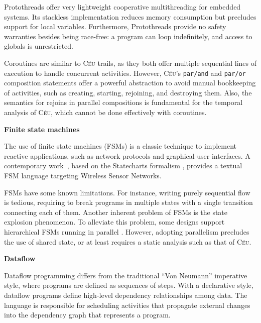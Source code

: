 \documentclass[11pt,a4paper]{article}
\newcommand{\2}{\;\;}
\newcommand{\5}{\;\;\;\;\;}
\newcommand{\CEU}{\textsc{C\'{e}u}}
\newcommand{\code}[1] {{\small{\texttt{#1}}}}
\begin{document}
Protothreads \cite{wsn.protothreads} offer very lightweight cooperative 
multithreading for embedded systems.
Its stackless implementation reduces memory consumption but precludes support 
for local variables.
Furthermore, Protothreads provide no safety warranties besides being race-free: 
a program can loop indefinitely, and access to globals is unrestricted.

Coroutines are similar to \CEU{} trails, as they both offer multiple sequential 
lines of execution to handle concurrent activities.
However, \CEU{}'s \code{par/and} and \code{par/or} composition statements offer 
a powerful abstraction to avoid manual bookkeeping of activities, such as 
creating, starting, rejoining, and destroying them.
Also, the semantics for rejoins in parallel compositions is fundamental for the 
temporal analysis of \CEU{}, which cannot be done effectively with coroutines.

\textbf{Finite state machines}

The use of finite state machines (FSMs) is a classic technique to implement
reactive applications, such as network protocols and graphical user interfaces.
A contemporary work~\cite{wsn.osm}, based on the Statecharts formalism 
\cite{statecharts.visual}, provides a textual FSM language targeting Wireless 
Sensor Networks.

FSMs have some known limitations.
For instance, writing purely sequential flow is tedious, requiring to break 
programs in multiple states with a single transition connecting each of them.  
Another inherent problem of FSMs is the state explosion phenomenon.
To alleviate this problem, some designs support hierarchical FSMs running in 
parallel \cite{wsn.osm}.
However, adopting parallelism precludes the use of shared state, or at least 
requires a static analysis such as that of \CEU{}.



\textbf{Dataflow}

Dataflow programming \cite{lustre.ieee91,lucid} differs from the traditional 
``Von Neumann'' imperative style, where programs are defined as sequences of 
steps.
With a declarative style, dataflow programs define high-level dependency 
relationships among data.
The language is responsible for scheduling activities that propagate external 
changes into the dependency graph that represents a program.
\end{document}
